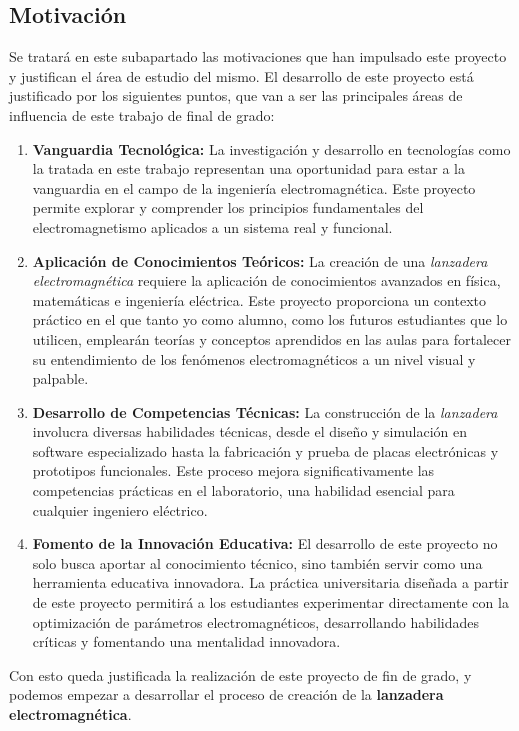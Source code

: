 \newpage
\subsection*{Motivación}

Se tratará en este subapartado las motivaciones que han impulsado este proyecto y justifican el área de estudio del mismo. El desarrollo de este proyecto está justificado por los siguientes puntos, que van a ser las principales áreas de influencia de este trabajo de final de grado:

\begin{enumerate}
    \item \textbf{Vanguardia Tecnológica:} La investigación y desarrollo en tecnologías como la tratada en este trabajo representan una oportunidad para estar a la vanguardia en el campo de la ingeniería electromagnética. Este proyecto permite explorar y comprender los principios fundamentales del electromagnetismo aplicados a un sistema real y funcional.
    \item \textbf{Aplicación de Conocimientos Teóricos:} La creación de una \textit{lanzadera electromagnética} requiere la aplicación de conocimientos avanzados en física, matemáticas e ingeniería eléctrica. Este proyecto proporciona un contexto práctico en el que tanto yo como alumno, como los futuros estudiantes que lo utilicen, emplearán teorías y conceptos aprendidos en las aulas para fortalecer su entendimiento de los fenómenos electromagnéticos a un nivel visual y palpable.
    \item \textbf{Desarrollo de Competencias Técnicas:} La construcción de la \textit{lanzadera} involucra diversas habilidades técnicas, desde el diseño y simulación en software especializado hasta la fabricación y prueba de placas electrónicas y prototipos funcionales. Este proceso mejora significativamente las competencias prácticas en el laboratorio, una habilidad esencial para cualquier ingeniero eléctrico.
    \item \textbf{Fomento de la Innovación Educativa:} El desarrollo de este proyecto no solo busca aportar al conocimiento técnico, sino también servir como una herramienta educativa innovadora. La práctica universitaria diseñada a partir de este proyecto permitirá a los estudiantes experimentar directamente con la optimización de parámetros electromagnéticos, desarrollando habilidades críticas y fomentando una mentalidad innovadora.
\end{enumerate}

Con esto queda justificada la realización de este proyecto de fin de grado, y podemos empezar a desarrollar el proceso de creación de la \textbf{lanzadera electromagnética}.